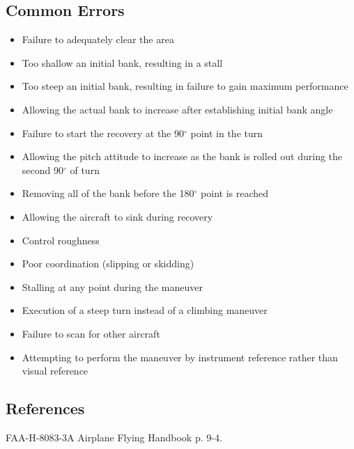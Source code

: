 \subsection{Common Errors}

\begin{itemize}
  \item Failure to adequately clear the area
  \item Too shallow an initial bank, resulting in a stall
  \item Too steep an initial bank, resulting in failure to gain maximum
    performance
  \item Allowing the actual bank to increase after establishing initial bank
    angle
  \item Failure to start the recovery at the 90$^\circ$ point in the turn
  \item Allowing the pitch attitude to increase as the bank is rolled out
    during the second 90$^\circ$ of turn
  \item Removing all of the bank before the 180$^\circ$ point is reached
  \item Allowing the aircraft to sink during recovery
  \item Control roughness
  \item Poor coordination (slipping or skidding)
  \item Stalling at any point during the maneuver
  \item Execution of a steep turn instead of a climbing maneuver
  \item Failure to scan for other aircraft
  \item Attempting to perform the maneuver by instrument reference rather than
    visual reference
\end{itemize}

\subsection{References}

FAA-H-8083-3A Airplane Flying Handbook p. 9-4.
